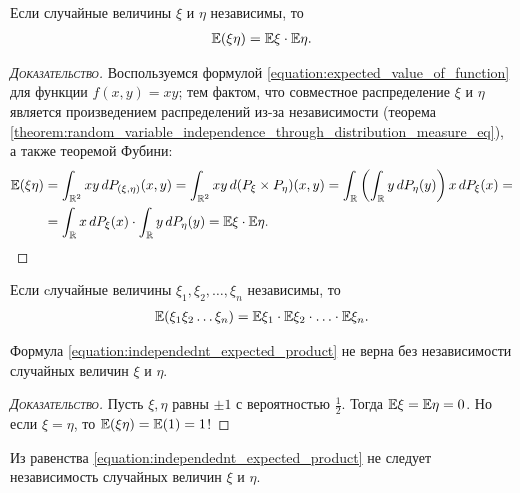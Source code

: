 \documentclass[../main.tex]{subfiles}
\begin{document}
\begin{prop}
 \label{proposition:independent_expected_product}
 Если случайные величины $ \xi $ и $ \eta $ независимы, то
 \begin{align}
  \label{equation:independednt_expected_product}
  \mathbb E(\xi \eta) = \mathbb E\xi \cdot \mathbb E\eta.
 \end{align} 
\end{prop}
\begin{proof}[\normalfont\textsc{Доказательство}]
 Воспользуемся формулой \eqref{equation:expected_value_of_function} для функции $ f(x,y) = xy $; тем фактом, что совместное распределение $ \xi $ и $ \eta $ является произведением распределений из-за независимости (теорема \ref{theorem:random_variable_independence_through_distribution_measure_eq}), а также теоремой Фубини:
 \begin{align*}
  \mathbb E(\xi\eta) &= \int_{\mathbb{R}^{2}} xy \,dP_{(\xi,\eta)} (x,y) = \int_{\mathbb{R}^{2}} xy\,d(P_{\xi} \times P_{\eta})(x,y) = \int_{\mathbb{R}} \left( \int_{\mathbb{R}} y\,dP_\eta(y)  \right)x\, dP_\xi(x) = \\
  &=  \int_{\mathbb{R}} x\,dP_\xi(x)  \cdot  \int_{\mathbb{R}} y\,dP_\eta(y)   = \mathbb E \xi \cdot \mathbb E\eta.
 \end{align*} 
\end{proof}
\begin{crly}
 Если cлучайные величины $ \xi_1,\xi_2, \ldots, \xi_n $ независимы, то
 \begin{align*}
  \mathbb E(\xi_1 \xi_2 \ldots \xi_n) = \mathbb E\xi_1 \cdot \mathbb E\xi_2 \cdot \ldots \cdot \mathbb E\xi_n.
 \end{align*} 
\end{crly}
\begin{remrk}
 Формула \eqref{equation:independednt_expected_product} не верна без независимости случайных величин $ \xi $ и $ \eta $.
\end{remrk}
\begin{proof}[\normalfont\textsc{Доказательство}]
 Пусть $ \xi, \eta $ равны $ \pm 1 $ с вероятностью $ \frac{1}{2} $. Тогда $ \mathbb E\xi = \mathbb E\eta = 0 $. Но если $ \xi = \eta $, то $ \mathbb E(\xi\eta) = \mathbb E(1) = 1 $!
\end{proof}
\begin{remrk}
 Из равенства \eqref{equation:independednt_expected_product} не следует независимость случайных величин $ \xi $ и $ \eta $.
\end{remrk}
\end{document}

